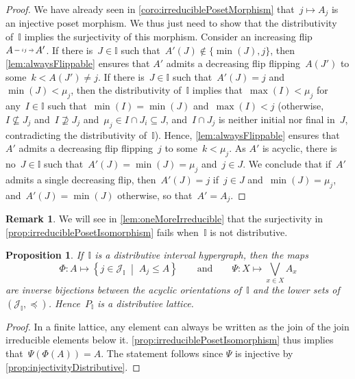 \documentclass[reqno]{amsart}
\newtheorem{proposition}[theorem]{Proposition}
\theoremstyle{definition}
\newtheorem{remark}[theorem]{Remark}
\newcommand{\cal}[1]{\mathcal{#1}} %
\newcommand{\set}[2]{\left\{ #1 \;\middle|\; #2 \right\}} %
\newcommand{\bigJoin}{\bigvee} %
\newcommand{\II}{\mathbb I} %
\newcommand{\cJ}{\cal{J}} %
\newcommand{\flip}[4]{\ensuremath{#1 \, \begin{tikzpicture}[scale=1,baseline=-.1cm] \path[->]  (0,0) edge node[fill=white,inner sep=2pt, font=\tiny ] {$#2#3$} (.7,0); \end{tikzpicture} \, #4}}
\begin{document}
\begin{proof}
We have already seen in \cref{coro:irreduciblePosetMorphism} that~$j \mapsto A_j$ is an injective poset morphism.
We thus just need to show that the distributivity of~$\II$ implies the surjectivity of this morphism.
Consider an increasing flip~\flip{A}{i}{j}{A'}.
If there is~$J \in \II$ such that~$A'(J) \notin \{\min(J), j\}$, then \cref{lem:alwaysFlippable} ensures that $A'$ admits a decreasing flip flipping~$A(J')$ to some~$k < A(J') \ne j$.
If there is~$J \in \II$ such that~$A'(J) = j$ and~$\min(J) < \mu_j$, then the distributivity of~$\II$ implies that~$\max(I) < \mu_j$ for any~$I \in \II$ such that~$\min(I) = \min(J)$ and~$\max(I) < j$ (otherwise, $I \not\subseteq J_j$ and~$I \not\supseteq J_j$ and~$\mu_j \in I \cap J_i \subseteq J$, and~$I \cap J_j$ is neither initial nor final in~$J$, contradicting the distributivity of~$\II$).
Hence, \cref{lem:alwaysFlippable} ensures that $A'$ admits a decreasing flip flipping~$j$ to some~$k < \mu_j$.
As $A'$ is acyclic, there is no~$J \in \II$ such that~$A'(J) = \min(J) = \mu_j$ and~$j \in J$.
We conclude that if~$A'$ admits a single decreasing flip, then~$A'(J) = j$ if~$j \in J$ and~$\min(J) = \mu_j$, and~$A'(J) = \min(J)$ otherwise, so that~$A' = A_j$.
\end{proof}

\begin{remark}
We will see in \cref{lem:oneMoreIrreducible} that the surjectivity in \cref{prop:irreduciblePosetIsomorphism} fails when~$\II$ is not distributive.
\end{remark}

\begin{proposition}
\label{prop:distributiveForwardI}
If~$\II$ is a distributive interval hypergraph, then the maps
\[
\Phi : A \mapsto \set{j \in \cJ_\II}{A_j \le A}
\qquad\text{and}\qquad
\Psi : X \mapsto \bigJoin_{x \in X} A_x
\]
are inverse bijections between the acyclic orientations of~$\II$ and the lower sets of~$(\cJ_\II, \preccurlyeq)$. Hence~$P_\II$ is a distributive lattice.
\end{proposition}

\begin{proof}
In a finite lattice, any element can always be written as the join of the join irreducible elements below it.
\cref{prop:irreduciblePosetIsomorphism} thus implies that~$\Psi(\Phi(A)) = A$.
The statement follows since $\Psi$ is injective by \cref{prop:injectivityDistributive}.
\end{proof}
\end{document}
